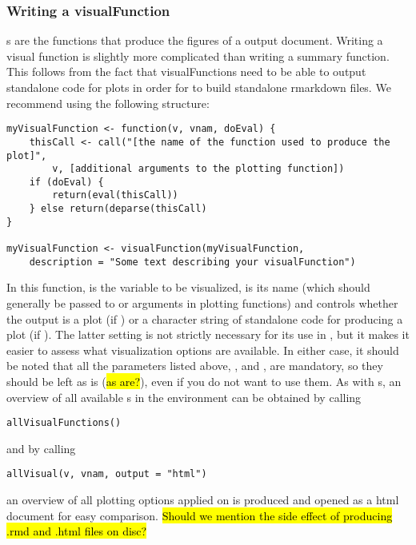 \documentclass[article]{jss}
\begin{document}
\subsubsection{Writing a visualFunction}
s are the functions that produce the figures of a  output document. Writing a visual function is slightly more complicated than writing a summary function. This follows from the fact that visualFunctions need to be able to output standalone code for plots in order for  to build standalone rmarkdown files. We recommend using the following structure:
\begin{Verbatim}
myVisualFunction <- function(v, vnam, doEval) {
	thisCall <- call("[the name of the function used to produce the plot]",
		v, [additional arguments to the plotting function])
	if (doEval) {
		return(eval(thisCall))
	} else return(deparse(thisCall)
}

myVisualFunction <- visualFunction(myVisualFunction,
	description = "Some text describing your visualFunction")
\end{Verbatim}
In this function,  is the variable to be visualized,  is its name (which should generally be passed to  or  arguments in plotting functions) and  controls whether the output is a plot (if ) or a character string of standalone code for producing a plot (if ). The latter  setting is not strictly necessary for its use in , but it makes it easier to assess what visualization options are available. In either case, it should be noted that all the parameters listed above, ,  and , are mandatory, so they should be left as is (\hl{as are?}), even if you do not want to use them. As with s, an overview of all available s in the environment can be obtained by calling
\begin{Verbatim}
allVisualFunctions()
\end{Verbatim}
and by calling
\begin{Verbatim}
allVisual(v, vnam, output = "html")
\end{Verbatim}
an overview of all plotting options applied on  is produced and opened as a html document for easy comparison. \hl{Should we mention the side effect of producing .rmd and .html files on disc?}
\end{document}
